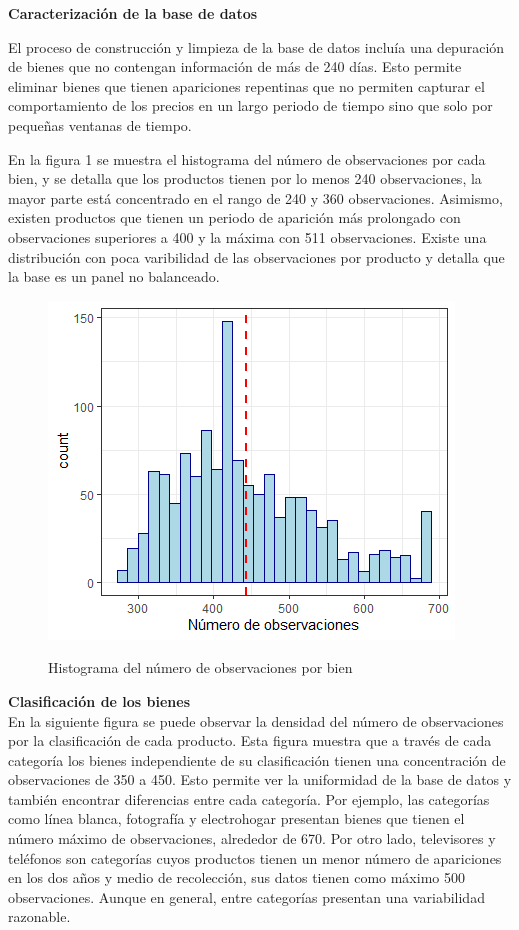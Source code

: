\documentclass[12pt,a4paper,pdflatex]{article}
\begin{document}
\clearpage

\textbf{Caracterización de la base de datos}

El proceso de construcción y limpieza de la base de datos incluía una depuración de bienes que no contengan información de más de 240 días. Esto permite eliminar bienes que tienen apariciones repentinas que no permiten capturar el comportamiento de los precios en un largo periodo de tiempo sino que solo por pequeñas ventanas de tiempo.

En la figura 1 se muestra el histograma del número de observaciones por cada bien, y se detalla que los productos tienen por lo menos 240 observaciones, la mayor parte está concentrado en el rango de 240 y 360 observaciones. Asimismo, existen productos que tienen un periodo de aparición más prolongado con observaciones superiores a 400 y la máxima con 511 observaciones. Existe una distribución con poca varibilidad de las observaciones por producto y detalla que la base es un panel no balanceado.
\begin{figure}[!ht]
\centering
 \caption{Histograma del número de observaciones por bien}
  \includegraphics[scale=1.0]{observaciones_producto.png}
  \label{fig:Histograma del número de observaciones por bien}
\end{figure}

\clearpage
\textbf{Clasificación de los bienes} \\

En la siguiente figura se puede observar la densidad del número de observaciones por la clasificación de cada producto. Esta figura muestra que a través de cada categoría los bienes independiente de su clasificación tienen una concentración de observaciones de 350 a 450. Esto permite ver la uniformidad de la base de datos y también encontrar diferencias entre cada categoría. Por ejemplo, las categorías como línea blanca, fotografía y electrohogar presentan bienes que tienen el número máximo de observaciones, alrededor de 670.  Por otro lado, televisores y teléfonos son categorías cuyos productos tienen un menor número de apariciones en los dos años y medio de recolección, sus datos tienen como máximo 500 observaciones. Aunque en general, entre categorías presentan una variabilidad razonable.
\end{document}

